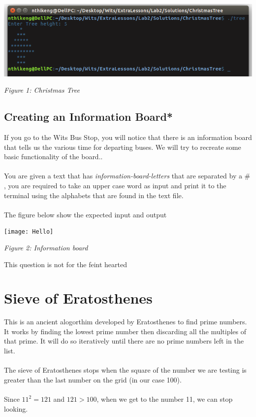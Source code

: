 \documentclass{article}
\begin{document}
\begin{center}
	\includegraphics[width=0.8\columnwidth]{Tree} %
	
	\textit{Figure 1: Christmas Tree}
\end{center}

\subsection{Creating an Information Board*}
If you go to the Wits Bus Stop, you will notice that there is an information board that tells us the various time for departing buses. We will try to recreate some basic functionality of the board..
\\\\
You are given a text that has \textit{information-board-letters} that are separated by a \# , you are required to take an upper case word as input and print it to the terminal using the alphabets that are found in the text file.
\\\\
The figure below show the expected input and output
\begin{center}
	\texttt{[image: Hello]} %
	
	\textit{Figure 2: Information board}
\end{center}

\begin{warn} %
This question is not for the feint hearted
\end{warn}

\newpage
\section{Sieve of Eratosthenes}
This is an ancient alogorthim developed by Eratosthenes to find prime numbers. It works by finding the lowest prime number then discarding all the multiples of that prime. It will do so iteratively until there are no prime numbers left in the list.
\\\\
The sieve of Eratosthenes stops when the square of the number we are testing is greater than the last number on the grid (in our case 100).
\\\\
Since $11^2  = 121$ and $121>100$, when we get to the number 11, we can stop looking.
\end{document}
